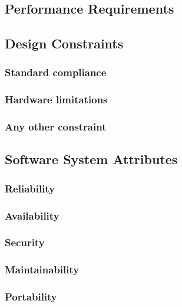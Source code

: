 \subsection{Performance Requirements}
\subsection{Design Constraints}
\subsubsection{Standard compliance}
\subsubsection{Hardware limitations}
\subsubsection{Any other constraint}
\subsection{Software System Attributes}
\subsubsection{Reliability}
\subsubsection{Availability}
\subsubsection{Security}
\subsubsection{Maintainability}
\subsubsection{Portability}
